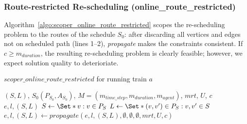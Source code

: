 \documentclass{article}
\begin{document}
\subsubsection{Route-restricted Re-scheduling (online\_route\_restricted)}
\label{subsubsec:scope_online_route_restricted}


Algorithm~\ref{algo:scoper_online_route_restricted} scopes the re-scheduling problem to the routes of the schedule $S_0$: after discarding all vertices and edges not on scheduled path (lines 1--2), \emph{propagate} makes the constraints consistent. If $c\geq m_{duration}$, the resulting re-scheduling problem is clearly feasible; however, we expect solution quality to deterioriate.

\begin{algorithm}
	\caption{$scoper\_online\_route\_restricted$ for running train $a$} \label{algo:scoper_online_route_restricted}
	\begin{algorithmic}[1]
		\Require $(S,L)$, $S_0(P_{S_0},A_{S_0})$, $M=(m_{time\_step},m_{duration},m_{agent})$, $mrt$, $U$, $c$
	    \Ensure $e,l,(S,L)$
        \State $S \leftarrow \Set*{v: v\in P_{S}}$
        \State $L \leftarrow \Set*{(v,v^\prime) \in P_{S}: v,v^\prime \in S}$
        \State $e,l,(S,L) \leftarrow propagate(e,l,(S,L),\emptyset, \emptyset, \emptyset, mrt, U, c)$
	\end{algorithmic}
\end{algorithm}
\end{document}
